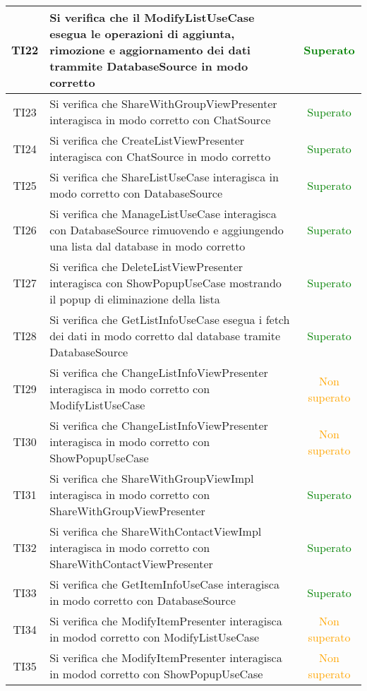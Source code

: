 \begin{center}
\begin{longtable}{|c|>{\centering}m{10cm}|c|}
		TI22 & Si verifica che il ModifyListUseCase esegua le operazioni di aggiunta, rimozione e aggiornamento dei dati trammite DatabaseSource in modo corretto & \textcolor{Green}{Superato}\\ \hline
		TI23 & Si verifica che ShareWithGroupViewPresenter interagisca in modo corretto con ChatSource & \textcolor{Green}{Superato}\\ \hline
		TI24 & Si verifica che CreateListViewPresenter interagisca con ChatSource in modo corretto & \textcolor{Green}{Superato}\\ \hline
		TI25 & Si verifica che ShareListUseCase interagisca in modo corretto con DatabaseSource & \textcolor{Green}{Superato}\\ \hline
		TI26 & Si verifica che ManageListUseCase interagisca con DatabaseSource rimuovendo e aggiungendo una lista dal database in modo corretto & \textcolor{Green}{Superato}\\ \hline
		TI27 & Si verifica che DeleteListViewPresenter interagisca con ShowPopupUseCase mostrando il popup di eliminazione della lista & \textcolor{Green}{Superato}\\ \hline
		TI28 & Si verifica che GetListInfoUseCase esegua i fetch dei dati in modo corretto dal database tramite DatabaseSource & \textcolor{Green}{Superato}\\ \hline
		TI29 & Si verifica che ChangeListInfoViewPresenter interagisca in modo corretto con ModifyListUseCase & \textcolor{Orange}{Non superato}\\ \hline
		TI30 & Si verifica che ChangeListInfoViewPresenter interagisca in modo corretto con ShowPopupUseCase & \textcolor{Orange}{Non superato}\\ \hline
		TI31 & Si verifica che ShareWithGroupViewImpl interagisca in modo corretto con ShareWithGroupViewPresenter & \textcolor{Green}{Superato}\\ \hline
		TI32 & Si verifica che ShareWithContactViewImpl interagisca in modo corretto con ShareWithContactViewPresenter & \textcolor{Green}{Superato}\\ \hline
		TI33 & Si verifica che GetItemInfoUseCase interagisca in modo corretto con DatabaseSource & \textcolor{Green}{Superato}\\ \hline
		TI34 & Si verifica che ModifyItemPresenter interagisca in modod corretto con ModifyListUseCase & \textcolor{Orange}{Non superato}\\ \hline
		TI35 & Si verifica che ModifyItemPresenter interagisca in modod corretto con ShowPopupUseCase & \textcolor{Orange}{Non superato}\\ \hline

\end{longtable}
\end{center}
